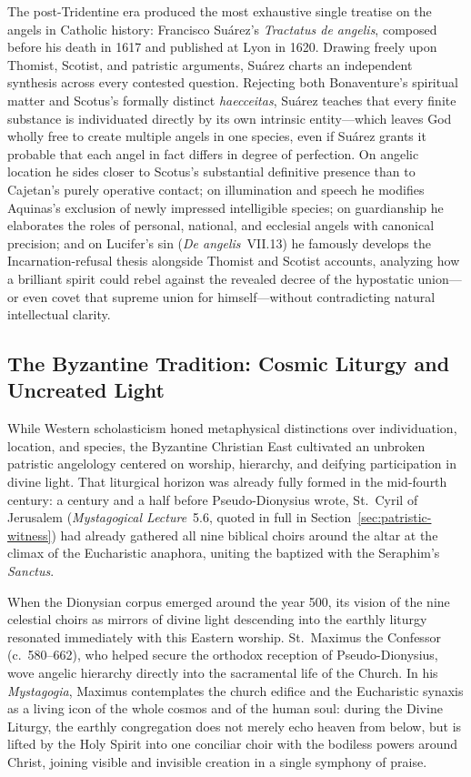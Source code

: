 The post-Tridentine era produced the most exhaustive single treatise on the angels in Catholic history: Francisco Su\'arez's \emph{Tractatus de angelis}, composed before his death in 1617 and published at Lyon in 1620. Drawing freely upon Thomist, Scotist, and patristic arguments, Su\'arez charts an independent synthesis across every contested question. Rejecting both Bonaventure's spiritual matter and Scotus's formally distinct \emph{haecceitas}, Su\'arez teaches that every finite substance is individuated directly by its own intrinsic entity---which leaves God wholly free to create multiple angels in one species, even if Su\'arez grants it probable that each angel in fact differs in degree of perfection. On angelic location he sides closer to Scotus's substantial definitive presence than to Cajetan's purely operative contact; on illumination and speech he modifies Aquinas's exclusion of newly impressed intelligible species; on guardianship he elaborates the roles of personal, national, and ecclesial angels with canonical precision; and on Lucifer's sin (\emph{De angelis}~VII.13) he famously develops the Incarnation-refusal thesis alongside Thomist and Scotist accounts, analyzing how a brilliant spirit could rebel against the revealed decree of the hypostatic union---or even covet that supreme union for himself---without contradicting natural intellectual clarity.

\subsection{The Byzantine Tradition: Cosmic Liturgy and Uncreated Light}

While Western scholasticism honed metaphysical distinctions over individuation, location, and species, the Byzantine Christian East cultivated an unbroken patristic angelology centered on worship, hierarchy, and deifying participation in divine light. That liturgical horizon was already fully formed in the mid-fourth century: a century and a half before Pseudo-Dionysius wrote, St.~Cyril of Jerusalem (\emph{Mystagogical Lecture}~5.6, quoted in full in Section~\ref{sec:patristic-witness}) had already gathered all nine biblical choirs around the altar at the climax of the Eucharistic anaphora, uniting the baptized with the Seraphim's \emph{Sanctus}.

When the Dionysian corpus emerged around the year 500, its vision of the nine celestial choirs as mirrors of divine light descending into the earthly liturgy resonated immediately with this Eastern worship. St.~Maximus the Confessor (c.~580--662), who helped secure the orthodox reception of Pseudo-Dionysius, wove angelic hierarchy directly into the sacramental life of the Church. In his \emph{Mystagogia}, Maximus contemplates the church edifice and the Eucharistic synaxis as a living icon of the whole cosmos and of the human soul: during the Divine Liturgy, the earthly congregation does not merely echo heaven from below, but is lifted by the Holy Spirit into one conciliar choir with the bodiless powers around Christ, joining visible and invisible creation in a single symphony of praise.

